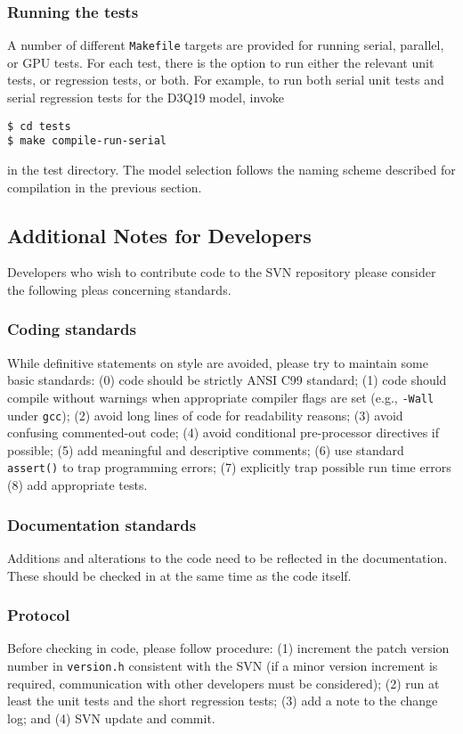 \subsubsection{Running the tests}

A number of different \texttt{Makefile} targets are provided for
running serial, parallel,
or GPU tests. For each test, there is the option to run either
the relevant unit tests, or regression tests, or both. For example, to
run both serial unit tests and serial regression tests for the D3Q19
model, invoke
\begin{lstlisting}
$ cd tests
$ make compile-run-serial
\end{lstlisting}
in the test directory.
The model selection follows the naming scheme described for compilation
in the previous section.


\subsection{Additional Notes for Developers}
\label{xref:developers}

Developers who wish to contribute code to the SVN repository
please consider the following pleas concerning standards.

\subsubsection{Coding standards}

While definitive statements on style are avoided, please try to
maintain some basic standards: (0) code should be strictly ANSI C99
standard; (1) code should compile without warnings when appropriate
compiler flags are set (e.g., \texttt{-Wall} under \texttt{gcc});
(2) avoid long lines of code for readability reasons;
(3) avoid confusing commented-out code; (4) avoid conditional pre-processor
directives if possible; (5) add meaningful and descriptive comments;
(6) use standard \texttt{assert()} to trap programming errors;
(7) explicitly trap possible run time errors (8) add appropriate
tests.

\subsubsection{Documentation standards}

Additions and alterations to the code need to be reflected in the
documentation. These should be checked in at the same time as the
code itself.

\subsubsection{Protocol}

Before checking in code, please follow procedure: (1) increment the
patch version number in \texttt{version.h} consistent with the SVN
(if a minor version increment is required, communication with
other developers must be considered); (2) run at least the unit
tests and the short regression tests; (3) add a note to the change
log; and (4) SVN update and commit.

\vfill
\pagebreak

